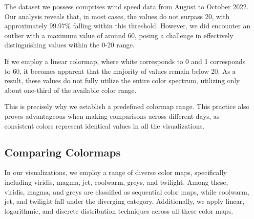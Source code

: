 \documentclass[conference]{IEEEtran}
\begin{document}

The dataset we possess comprises wind speed data from August to October 2022. Our analysis reveals that, in most cases, the values do not surpass 20, with approximately 99.97\% falling within this threshold. However, we did encounter an outlier with a maximum value of around 60, posing a challenge in effectively distinguishing values within the 0-20 range.

If we employ a linear colormap, where white corresponds to 0 and 1 corresponds to 60, it becomes apparent that the majority of values remain below 20. As a result, these values do not fully utilize the entire color spectrum, utilizing only about one-third of the available color range.

This is precisely why we establish a predefined colormap range. This practice also proves advantageous when making comparisons across different days, as consistent colors represent identical values in all the visualizations.

\subsection{Comparing Colormaps}
In our visualizations, we employ a range of diverse color maps, specifically including viridis, magma, jet, coolwarm, greys, and twilight. Among these, viridis, magma, and greys are classified as sequential color maps, while coolwarm, jet, and twilight fall under the diverging category. Additionally, we apply linear, logarithmic, and discrete distribution techniques across all these color maps.
\end{document}
